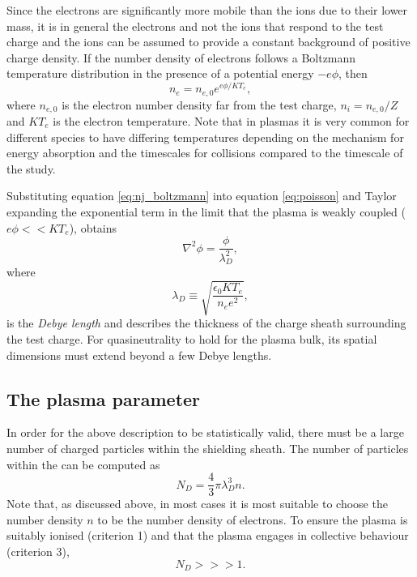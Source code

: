 Since the electrons are significantly more mobile than the ions due to their lower mass, it is in general the electrons and not the ions that respond to the test charge and the ions can be assumed to provide a constant background of positive charge density.
If the number density of electrons follows a Boltzmann temperature distribution in the presence of a potential energy $-e\phi$, then
\begin{equation}\label{eq:nj_boltzmann}
	n_e= n_{e,0}e^{e\phi/KT_e},
\end{equation}
where $n_{e,0}$ is the electron number density far from the test charge, $n_i = n_{e,0}/Z$ and $KT_e$ is the electron temperature. Note that in plasmas it is very common for different species to have differing temperatures depending on the mechanism for energy absorption and the timescales for collisions compared to the timescale of the study.

Substituting equation \ref{eq:nj_boltzmann} into equation \ref{eq:poisson} and Taylor expanding the exponential term in the limit that the plasma is weakly coupled ($e\phi << KT_e$), obtains 
\begin{equation}\label{eq:poisson_debye2}
	\nabla^2\phi = \frac{\phi}{\lambda_D^2},
\end{equation}
where
\begin{equation}\label{eq:debye}
	\lambda_D \equiv \sqrt{\frac{\epsilon_0KT_e}{n_ee^2}},
\end{equation}
is the \textit{Debye length} and describes the thickness of the charge sheath surrounding the test charge. For quasineutrality to hold for the plasma bulk, its spatial dimensions must extend beyond a few Debye lengths.

\subsection{\label{sec:plasma_parameter}The plasma parameter}
In order for the above description to be statistically valid, there must be a large number of charged particles within the shielding sheath. The number of particles within the  can be computed as
\begin{equation}\label{eq:plasma_parameter}
	N_D = \frac{4}{3}\pi\lambda_D^3n.
\end{equation}
Note that, as discussed above, in most cases it is most suitable to choose the number density $n$ to be the number density of electrons. To ensure the plasma is suitably ionised (criterion 1) and that the plasma engages in collective behaviour (criterion 3),
\begin{equation}\label{eq:plasma_parameter_condition}
	N_D >>> 1.
\end{equation}
